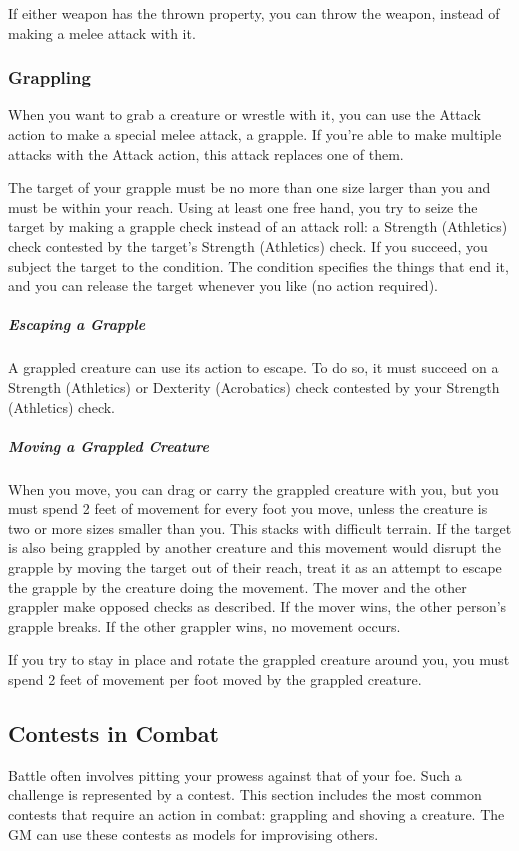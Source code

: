 If either weapon has the thrown property, you can throw the weapon, instead of making a melee attack with it.

\subsubsection{Grappling}

When you want to grab a creature or wrestle with it, you can use the Attack action to make a special melee attack, a grapple. If you're able to make multiple attacks with the Attack action, this attack replaces one of them.

The target of your grapple must be no more than one size larger than you and must be within your reach. Using at least one free hand, you try to seize the target by making a grapple check instead of an attack roll: a Strength (Athletics) check contested by the target's Strength (Athletics) check. If you succeed, you subject the target to the  condition. The condition specifies the things that end it, and you can release the target whenever you like (no action required).

\subparagraph*{Escaping a Grapple} A grappled creature can use its action to escape. To do so, it must succeed on a Strength (Athletics) or Dexterity (Acrobatics) check contested by your Strength
(Athletics) check.

\subparagraph*{Moving a Grappled Creature} When you move, you can drag or carry the grappled creature with you, but you must spend 2 feet of movement for every foot you move, unless the creature is two or more sizes smaller than you. This stacks with difficult terrain. If the target is also being grappled by another creature and this movement would disrupt the grapple by moving the target out of their reach, treat it as an attempt to escape the grapple by the creature doing the movement. The mover and the other grappler make opposed checks as described. If the mover wins, the other person's grapple breaks. If the other grappler wins, no movement occurs.

If you try to stay in place and rotate the grappled creature around you, you must spend 2 feet of movement per foot moved by the grappled creature.

\subsection{Contests in Combat}

Battle often involves pitting your prowess against that of your foe. Such a challenge is represented by a contest. This section includes the most common contests that require an action in combat: grappling and shoving a creature. The GM can use these contests as models for improvising others.

